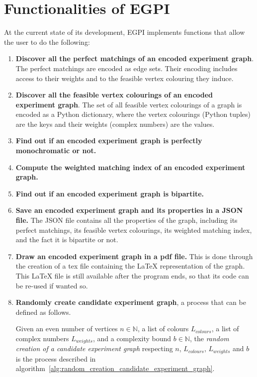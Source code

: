 \section{Functionalities of EGPI}
\label{sec:functionalities-of-egpi}

At the current state of its development, EGPI implements functions that allow the user to do the following:

\begin{enumerate}
    \item \textbf{Discover all the perfect matchings of an encoded experiment graph}.
        The perfect matchings are encoded as edge sets.
        Their encoding includes access to their weights and to the feasible vertex colouring they induce.
    \item \textbf{Discover all the feasible vertex colourings of an encoded experiment graph}.
        The set of all feasible vertex colourings of a graph is encoded as a Python dictionary, where the vertex colourings (Python tuples) are the keys and their weights (complex numbers) are the values.
    \item \textbf{Find out if an encoded experiment graph is perfectly monochromatic or not.}
    \item \textbf{Compute the weighted matching index of an encoded experiment graph.}
    \item \textbf{Find out if an encoded experiment graph is bipartite.}
    \item \textbf{Save an encoded experiment graph and its properties in a JSON file.}
        The JSON file contains all the properties of the graph, including its perfect matchings, its feasible vertex colourings, its weighted matching index, and the fact it is bipartite or not.
    \item \textbf{Draw an encoded experiment graph in a pdf file.}
        This is done through the creation of a tex file containing the LaTeX representation of the graph.
        This LaTeX file is still available after the program ends, so that its code can be re-used if wanted so.
    \item \textbf{Randomly create candidate experiment graph}, a process that can be defined as follows.
        \begin{definition}
            \label{def:random-creation-candidate-experiment-graph}
            Given an even number of vertices $n \in \mathbb{N}$, a list of colours $L_{colours}$, a list of complex numbers $L_{weights}$, and a complexity bound $b \in \mathbb{N}$, the \textit{random creation of a candidate experiment graph} respecting $n$, $L_{colours}$, $L_{weights}$ and $b$ is the process described in algorithm~\ref{alg:random_creation_candidate_experiment_graph}.


\end{definition}
\end{enumerate}

